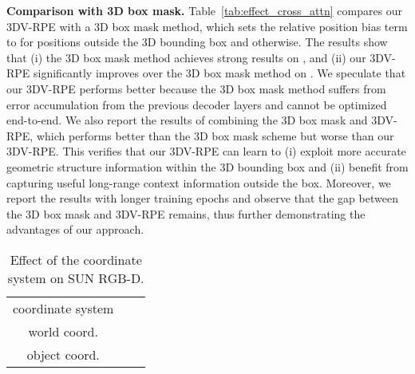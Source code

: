 \documentclass[10pt,twocolumn,letterpaper]{article}
\begin{document}
\vspace{1mm}
\noindent \textbf{Comparison with 3D box mask.}
Table~\ref{tab:effect_cross_attn} compares our 3DV-RPE with a 3D box mask method, which sets the relative position bias term to  for positions outside the 3D bounding box and  otherwise. The results show that (i) the 3D box mask method achieves strong results on , and (ii) our 3DV-RPE significantly improves over the 3D box mask method on . We speculate that our 3DV-RPE performs better because the 3D box mask method suffers from error accumulation from the previous decoder layers and cannot be optimized end-to-end.
We also report the results of combining the 3D box mask and 3DV-RPE, which performs better than the 3D box mask scheme but worse than our 3DV-RPE. This verifies that our 3DV-RPE can learn to (i) exploit more accurate geometric structure information within the 3D bounding box and (ii) benefit from capturing useful long-range context information outside the box. Moreover, we report the results with longer training epochs and observe that the gap between the 3D box mask and 3DV-RPE remains, thus further demonstrating the advantages of our approach.

\begin{table}[t]
\footnotesize
\renewcommand{\arraystretch}{1.1}
\centering
\begin{minipage}{1\linewidth}
{\begin{center}
\resizebox{1.0\linewidth}{!}
{
\begin{tabular}{c|cc}
coordinate system  &  &  \\
    \shline
   world coord.&  &  \\ 
   \rowcolor{gray!10}object coord.&  &  \\ 
\end{tabular}
}
\end{center}}
\end{minipage}
\caption{\small Effect of the coordinate system on SUN RGB-D.}
\label{tab:3dv_rpe_rotation}
\end{table}
\end{document}
